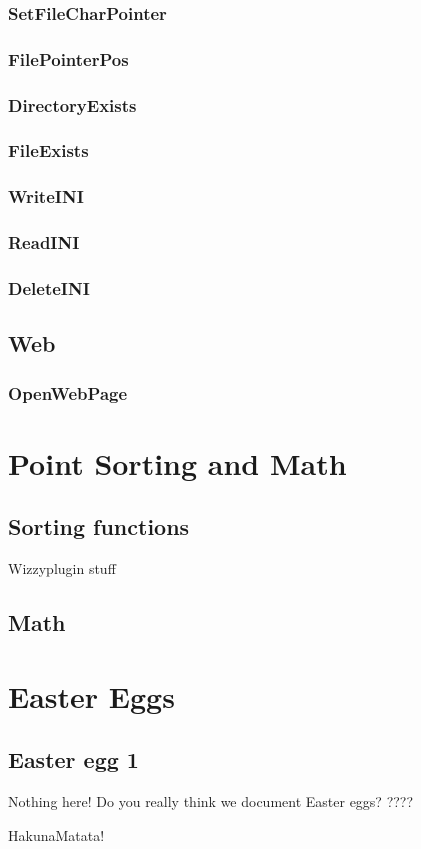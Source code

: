\documentclass[a4paper]{report}
\begin{document}
\subsection{SetFileCharPointer}
\subsection{FilePointerPos}
\subsection{DirectoryExists}
\subsection{FileExists}
\subsection{WriteINI}
\subsection{ReadINI}
\subsection{DeleteINI}

\section{Web}

\subsection{OpenWebPage}

\chapter{Point Sorting and Math}
\section{Sorting functions}
Wizzyplugin stuff

\section{Math}

\chapter{Easter Eggs}
\section{Easter egg 1}
Nothing here! Do you really think we document Easter eggs?
????

HakunaMatata!
\end{document}
